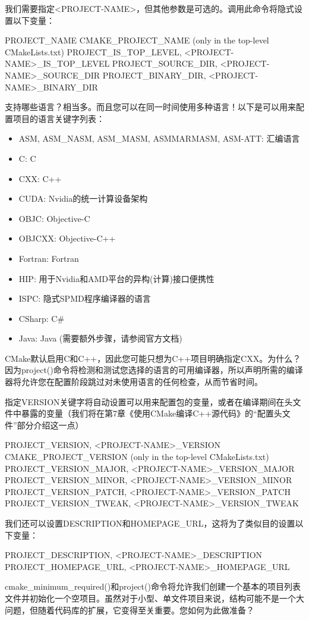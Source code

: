 我们需要指定<PROJECT-NAME>，但其他参数是可选的。调用此命令将隐式设置以下变量：

\begin{shell}
PROJECT_NAME
CMAKE_PROJECT_NAME (only in the top-level CMakeLists.txt)
PROJECT_IS_TOP_LEVEL, <PROJECT-NAME>_IS_TOP_LEVEL
PROJECT_SOURCE_DIR, <PROJECT-NAME>_SOURCE_DIR
PROJECT_BINARY_DIR, <PROJECT-NAME>_BINARY_DIR
\end{shell}

支持哪些语言？相当多。而且您可以在同一时间使用多种语言！以下是可以用来配置项目的语言关键字列表：

\begin{itemize}
\item
ASM, ASM\_NASM, ASM\_MASM, ASMMARMASM, ASM-ATT: 汇编语言

\item
C: C

\item
CXX: C++

\item
CUDA: Nvidia的统一计算设备架构

\item
OBJC: Objective-C

\item
OBJCXX: Objective-C++

\item
Fortran: Fortran

\item
HIP: 用于Nvidia和AMD平台的异构(计算)接口便携性

\item
ISPC: 隐式SPMD程序编译器的语言

\item
CSharp: C\#

\item
Java: Java (需要额外步骤，请参阅官方文档)
\end{itemize}

CMake默认启用C和C++，因此您可能只想为C++项目明确指定CXX。为什么？因为project()命令将检测和测试您选择的语言的可用编译器，所以声明所需的编译器将允许您在配置阶段跳过对未使用语言的任何检查，从而节省时间。

指定VERSION关键字将自动设置可以用来配置包的变量，或者在编译期间在头文件中暴露的变量（我们将在第7章《使用CMake编译C++源代码》的“配置头文件”部分介绍这一点）

\begin{shell}
PROJECT_VERSION, <PROJECT-NAME>_VERSION
CMAKE_PROJECT_VERSION (only in the top-level CMakeLists.txt)
PROJECT_VERSION_MAJOR, <PROJECT-NAME>_VERSION_MAJOR
PROJECT_VERSION_MINOR, <PROJECT-NAME>_VERSION_MINOR
PROJECT_VERSION_PATCH, <PROJECT-NAME>_VERSION_PATCH
PROJECT_VERSION_TWEAK, <PROJECT-NAME>_VERSION_TWEAK
\end{shell}

我们还可以设置DESCRIPTION和HOMEPAGE\_URL，这将为了类似目的设置以下变量：

\begin{shell}
PROJECT_DESCRIPTION, <PROJECT-NAME>_DESCRIPTION
PROJECT_HOMEPAGE_URL, <PROJECT-NAME>_HOMEPAGE_URL
\end{shell}

cmake\_minimum\_required()和project()命令将允许我们创建一个基本的项目列表文件并初始化一个空项目。虽然对于小型、单文件项目来说，结构可能不是一个大问题，但随着代码库的扩展，它变得至关重要。您如何为此做准备？


